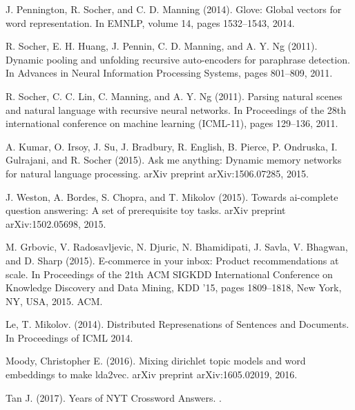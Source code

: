 \documentclass[twoside]{article}
\begin{document}
\begin{thebibliography}{99}
J. Pennington, R. Socher, and C. D. Manning (2014). 
\newblock  Glove: Global vectors for word representation.
\newblock In EMNLP, volume 14, pages 1532–1543, 2014.

R. Socher, E. H. Huang, J. Pennin, C. D. Manning, and A. Y. Ng (2011). 
\newblock  Dynamic pooling and unfolding recursive auto-encoders for paraphrase detection.
\newblock In Advances in Neural Information Processing Systems, pages 801–809, 2011.

R. Socher, C. C. Lin, C. Manning, and A. Y. Ng (2011). 
\newblock  Parsing natural scenes and natural language with recursive neural networks.
\newblock In Proceedings of the 28th international conference on machine learning (ICML-11), pages 129–136, 2011.

A. Kumar, O. Irsoy, J. Su, J. Bradbury, R. English, B. Pierce, P. Ondruska, I. Gulrajani, and R. Socher (2015). 
\newblock  Ask me anything: Dynamic memory networks for natural language processing.
\newblock arXiv preprint arXiv:1506.07285, 2015.

J. Weston, A. Bordes, S. Chopra, and T. Mikolov (2015). 
\newblock  Towards ai-complete question answering: A set of prerequisite toy tasks.
\newblock arXiv preprint arXiv:1502.05698, 2015.

M. Grbovic, V. Radosavljevic, N. Djuric, N. Bhamidipati, J. Savla, V. Bhagwan, and D. Sharp (2015). 
\newblock  E-commerce in your inbox: Product recommendations at scale.
\newblock In Proceedings of the 21th ACM SIGKDD International Conference on Knowledge Discovery and Data Mining, KDD ’15, pages 1809–1818, New York, NY, USA, 2015. ACM.

Le, T. Mikolov. (2014). 
\newblock  Distributed Represenations of Sentences and Documents.
\newblock In Proceedings of ICML 2014.

Moody, Christopher E. (2016). 
\newblock  Mixing dirichlet topic models and word embeddings to make lda2vec.
\newblock arXiv preprint arXiv:1605.02019, 2016.

Tan J. (2017). 
 Years of NYT Crossword Answers.
.

\end{thebibliography}
\end{document}
